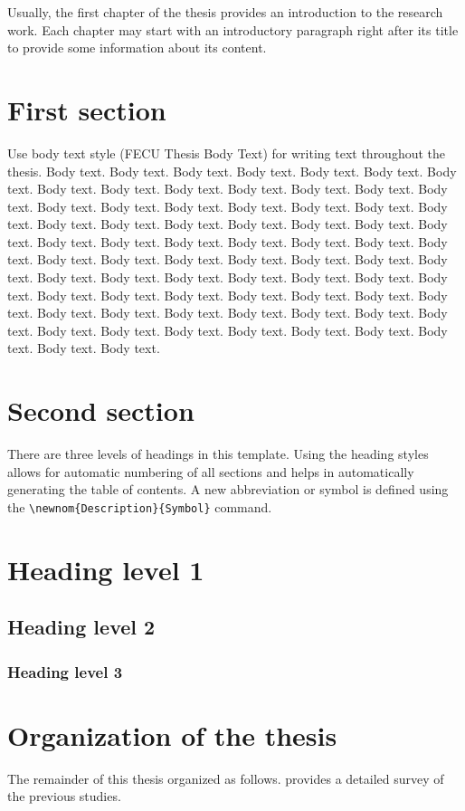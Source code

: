 Usually, the first chapter of the thesis provides an introduction to the research work. Each chapter may start with an introductory paragraph right after its title to provide some information about its content.

\section{First section}

Use body text style (FECU Thesis Body Text) for writing text throughout the thesis.
Body text. Body text. Body text. Body text. Body text. Body text. Body text. Body text. Body text. Body text. Body text. Body text. Body text. Body text. Body text. Body text. Body text. Body text. Body text. Body text. Body text. Body text. Body text. Body text. Body text. Body text. Body text. Body text. Body text.
Body text. Body text. Body text. Body text. Body text. Body text. Body text. Body text. Body text. Body text. Body text. Body text. Body text. Body text. Body text. Body text. Body text. Body text. Body text. Body text. Body text. Body text. Body text. Body text. Body text. Body text. Body text. Body text. Body text. Body text. Body text. Body text. Body text. Body text. Body text. Body text. Body text. Body text. Body text. Body text. Body text. Body text. Body text.

\section{Second section}

There are three levels of headings in this template. Using the heading styles allows for automatic numbering of all sections and helps in automatically generating the table of contents. A new abbreviation or symbol  is defined using the \verb+\newnom{Description}{Symbol}+ command.

\section{Heading level 1}

\subsection{Heading level 2}

\subsubsection{Heading level 3}

\section{Organization of the thesis}

The remainder of this thesis organized as follows.  provides a detailed survey of the previous studies.

